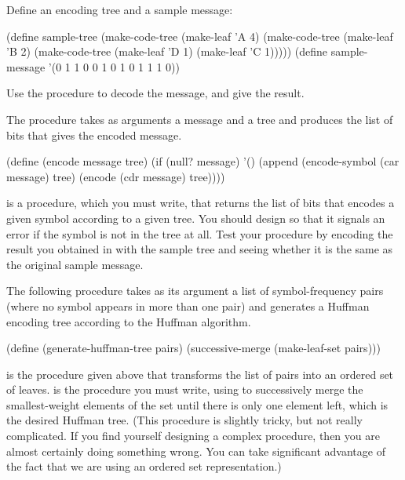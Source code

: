 \begin{exerciseGroup}
\label{Exercise 2.67}
 Define an encoding tree and a
sample message:

\begin{codeBlock}
(define sample-tree
  (make-code-tree (make-leaf 'A 4)
                  (make-code-tree
                   (make-leaf 'B 2)
                   (make-code-tree
                    (make-leaf 'D 1)
                    (make-leaf 'C 1)))))
(define sample-message '(0 1 1 0 0 1 0 1 0 1 1 1 0))
\end{codeBlock}

Use the  procedure to decode the message, and give the \mbox{result}.

\label{Exercise 2.68}
 The  procedure takes
as arguments a message and a tree and produces the list of bits that gives the
encoded message.

\begin{codeBlock}
(define (encode message tree)
  (if (null? message)
      '()
      (append (encode-symbol (car message) tree)
              (encode (cdr message) tree))))
\end{codeBlock}

 is a procedure, which you must write, that returns the
list of bits that encodes a given symbol according to a given tree.  You should
design  so that it signals an error if the symbol is not in
the tree at all.  Test your procedure by encoding the result you obtained in
 with the sample tree and seeing whether it is the same as
the original sample message.

\label{Exercise 2.69}
 The following procedure takes as
its argument a list of symbol-frequency pairs (where no symbol appears in more
than one pair) and generates a Huffman encoding tree according to the Huffman
algorithm.

\begin{codeBlock}
(define (generate-huffman-tree pairs)
  (successive-merge (make-leaf-set pairs)))
\end{codeBlock}

 is the procedure given above that transforms the list of
pairs into an ordered set of leaves.   is the procedure
you must write, using  to successively merge the
smallest-weight elements of the set until there is only one element left, which
is the desired Huffman tree.  (This procedure is slightly tricky, but not
really complicated.  If you find yourself designing a complex procedure, then
you are almost certainly doing something wrong.  You can take significant
advantage of the fact that we are using an ordered set representation.)


\end{exerciseGroup}
